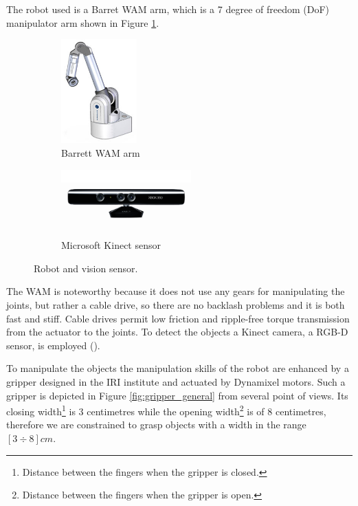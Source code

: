 The robot used is a Barret WAM arm, which is a 7 degree of freedom (DoF) manipulator arm shown in Figure \ref{fig:wam_1}. 
\begin{figure}[htp]
\centering
\begin{subfigure}[b]{0.45\textwidth}
\centering
\includegraphics[height=4cm]{Img/set_up/wam.jpg}
\caption{Barrett WAM arm}\label{fig:wam_1}
\end{subfigure}
\begin{subfigure}[b]{0.45\textwidth}
\centering
\includegraphics[width=5cm]{Img/set_up/Kinect.jpg}
\caption{Microsoft Kinect sensor}\label{fig:kinect}
\end{subfigure}
\caption{Robot and vision sensor.}
\end{figure}
The WAM is noteworthy because it does not use any gears for manipulating the joints, but rather a cable drive, so there are no backlash problems and it is both fast and stiff. Cable drives permit low friction and ripple-free torque transmission from the actuator to the joints. 
To detect the objects a Kinect camera, a RGB-D sensor, is employed ().

To manipulate the objects the manipulation skills of the robot are enhanced by a gripper designed in the IRI institute and actuated by Dynamixel motors. Such a gripper is depicted in Figure \ref{fig:gripper_general} from several point of views. Its closing width\footnote{Distance between the fingers when the gripper is closed.} is $3$ centimetres while the opening width\footnote{Distance between the fingers when the gripper is open.} is of $8$ centimetres, therefore we are constrained to grasp objects with a width in the range $[3 \div 8]cm$.

